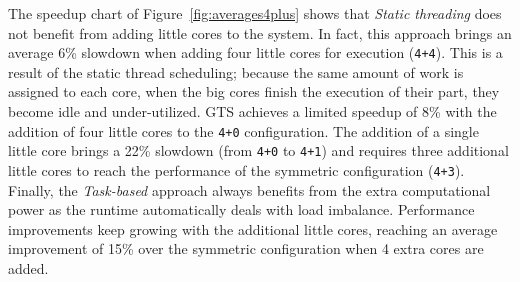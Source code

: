 The speedup chart of Figure~\ref{fig:averages4plus} shows that \emph{Static threading} does not benefit from adding little cores to the system.
In fact, this approach brings an average 6\% slowdown when adding four little cores for execution (\texttt{4+4}).
This is a result of the static thread scheduling; because the same amount of work is assigned to each core, when the big cores finish the execution of their part, they become idle and under-utilized. 
GTS achieves a limited speedup of 8\% with the addition of four little cores to the \texttt{4+0} configuration. The addition of a single little core brings a 22\% slowdown (from \texttt{4+0} to \texttt{4+1}) and requires three additional little cores to reach the performance of the symmetric configuration (\texttt{4+3}).  Finally, the \emph{Task-based} approach always benefits from the extra computational power as the runtime automatically deals with load imbalance. Performance improvements keep growing with the additional little cores, reaching an average improvement of 15\% over the symmetric configuration when 4 extra cores are added. 





